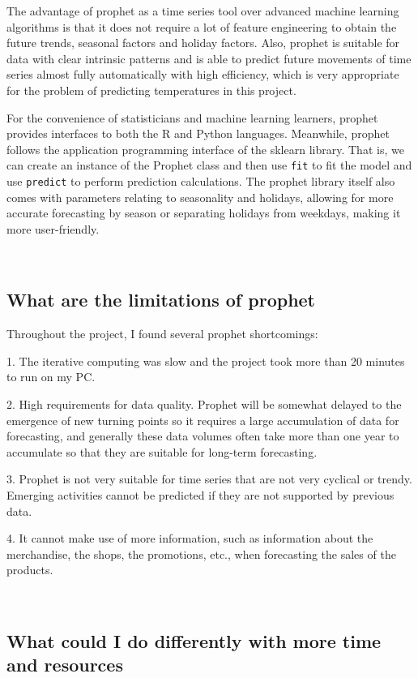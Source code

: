 \documentclass{article}
\begin{document}
The advantage of prophet as a time series tool over advanced machine learning algorithms is that it does not require a lot of feature engineering to obtain the future trends, seasonal factors and holiday factors. Also, prophet is suitable for data with clear intrinsic patterns and is able to predict future movements of time series almost fully automatically with high efficiency, which is very appropriate for the problem of predicting temperatures in this project.

For the convenience of statisticians and machine learning learners, prophet provides interfaces to both the R and Python languages. Meanwhile, prophet follows the application programming interface of the sklearn library. That is, we can create an instance of the Prophet class and then use \verb|fit| to fit the model and use \verb|predict| to perform prediction calculations. The prophet library itself also comes with parameters relating to seasonality and holidays, allowing for more accurate forecasting by season or separating holidays from weekdays, making it more user-friendly.
 
\ 

\subsection{What are the limitations of prophet}

Throughout the project, I found several prophet shortcomings:

1. The iterative computing was slow and the project took more than 20 minutes to run on my PC.

2. High requirements for data quality. Prophet will be somewhat delayed to the emergence of new turning points so it requires a large accumulation of data for forecasting, and generally these data volumes often take more than one year to accumulate so that they are suitable for long-term forecasting.

3. Prophet is not very suitable for time series that are not very cyclical or trendy. Emerging activities cannot be predicted if they are not supported by previous data.

4. It cannot make use of more information, such as information about the merchandise, the shops, the promotions, etc., when forecasting the sales of the products.

\ 

\subsection{What could I do differently with more time and resources}
\end{document}
